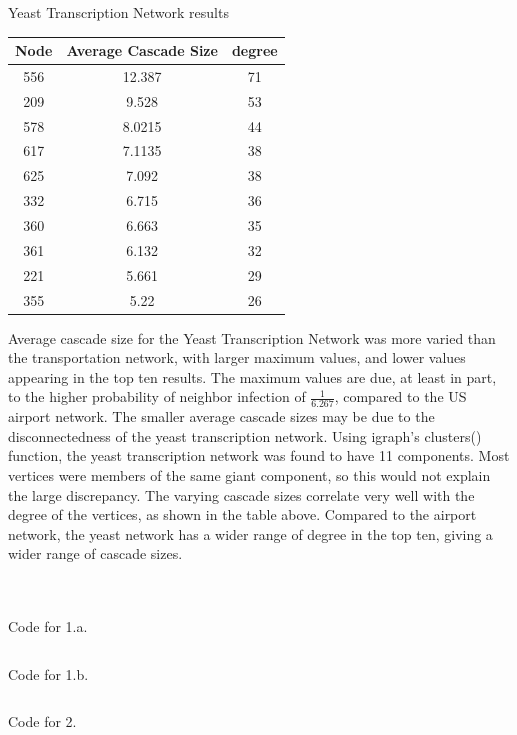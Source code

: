 \documentclass[11pt, oneside]{article}   	%
\begin{document}
\begin{center} Yeast Transcription Network results\\
\begin{tabular}{c|c|c}
\hline
Node & Average Cascade Size & degree\\
\hline
556 &12.387&71\\
\hline
209& 9.528&53\\
\hline
578 &8.0215&44\\
\hline
617& 7.1135&38\\
\hline
625 &7.092&38\\
\hline
332 &6.715&36\\
\hline
360 &6.663&35\\
\hline
361 &6.132&32\\
\hline
221 &5.661&29\\
\hline
355 &5.22&26\\
\hline
\end{tabular}
\end{center}
\indent\indent Average cascade size for the Yeast Transcription Network was more varied than the transportation network, with larger maximum values, and lower values appearing in the top ten results.  The maximum values are due, at least in part, to the higher probability of neighbor infection of $\frac{1}{6.267}$, compared to the US airport network.  The smaller average cascade sizes may be due to the disconnectedness of the yeast transcription network.  Using igraph's clusters() function, the yeast transcription network was found to have 11 components.  Most vertices were members of the same giant component, so this would not explain the large discrepancy.  The varying cascade sizes correlate very well with the degree of the vertices, as shown in the table above.  Compared to the airport network, the yeast network has a wider range of degree in the top ten, giving a wider range of cascade sizes.\\\\\\
\begin{center}
Code for 1.a.\\
\end{center}
\inputminted[linenos,fontsize=\scriptsize]{python}{fastq1.py}
\begin{center}
Code for 1.b.\\
\end{center}
\inputminted[linenos,fontsize=\scriptsize]{python}{q1b.py}
\begin{center}
Code for 2.\\
\end{center}
\inputminted[linenos,fontsize=\scriptsize]{python}{ec.py}
\end{document}
